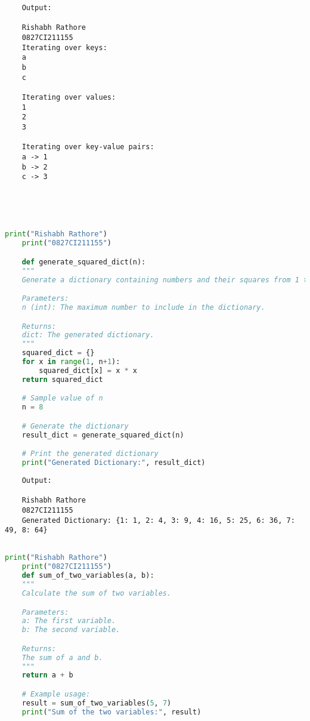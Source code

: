 \documentclass{report}
\begin{document}
\begin{verbatim}
	Output:

	Rishabh Rathore
	0827CI211155
	Iterating over keys:
	a
	b
	c
	
	Iterating over values:
	1
	2
	3
	
	Iterating over key-value pairs:
	a -> 1
	b -> 2
	c -> 3
	
	
	
	

\end{verbatim}


\bigskip


\sol 
\begin{lstlisting}[language=Python]
	print("Rishabh Rathore")
	print("0827CI211155")

	def generate_squared_dict(n):
    """
    Generate a dictionary containing numbers and their squares from 1 to n.

    Parameters:
    n (int): The maximum number to include in the dictionary.

    Returns:
    dict: The generated dictionary.
    """
    squared_dict = {}
    for x in range(1, n+1):
        squared_dict[x] = x * x
    return squared_dict

	# Sample value of n
	n = 8

	# Generate the dictionary
	result_dict = generate_squared_dict(n)

	# Print the generated dictionary
	print("Generated Dictionary:", result_dict)

\end{lstlisting}

\begin{verbatim}
	Output:

	Rishabh Rathore
	0827CI211155
	Generated Dictionary: {1: 1, 2: 4, 3: 9, 4: 16, 5: 25, 6: 36, 7: 49, 8: 64}


\end{verbatim}


\bigskip


\sol 
\begin{lstlisting}[language=Python]
	print("Rishabh Rathore")
	print("0827CI211155")
	def sum_of_two_variables(a, b):
    """
    Calculate the sum of two variables.

    Parameters:
    a: The first variable.
    b: The second variable.

    Returns:
    The sum of a and b.
    """
    return a + b

	# Example usage:
	result = sum_of_two_variables(5, 7)
	print("Sum of the two variables:", result)
  

\end{lstlisting}
\end{document}
